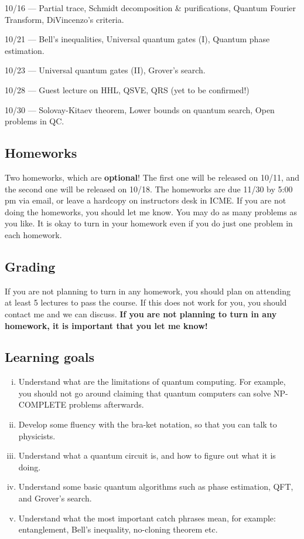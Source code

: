\documentclass[10pt]{article}
\newcounter{ex}
\theoremstyle{plain}
\theoremstyle{definition}
\begin{document}
10/16 --- Partial trace, Schmidt decomposition \& purifications, Quantum Fourier Transform, DiVincenzo's criteria.

10/21 --- Bell's inequalities, Universal quantum gates (I), Quantum phase estimation.

10/23 --- Universal quantum gates (II), Grover's search.

10/28 --- Guest lecture on HHL, QSVE, QRS (yet to be confirmed!)

10/30 --- Solovay-Kitaev theorem, Lower bounds on quantum search, Open problems in QC.

\subsection{Homeworks}
Two homeworks, which are \textbf{optional}! The first one will be released on 10/11, and the second one will be released on 10/18. The homeworks are due 11/30 by 5:00 pm via email, or leave a hardcopy on instructors desk in ICME. If you are not doing the homeworks, you should let me know. You may do as many problems as you like. It is okay to turn in your homework even if you do just one problem in each homework.

\subsection{Grading}
If you are not planning to turn in any homework, you should plan on attending at least 5 lectures to pass the course. If this does not work for you, you should contact me and we can discuss. \textbf{If you are not planning to turn in any homework, it is important that you let me know!}

\subsection{Learning goals}
\begin{enumerate}[(i)]
\item Understand what are the limitations of quantum computing. For example, you should not go around claiming that quantum computers can solve NP-COMPLETE problems afterwards.
\item Develop some fluency with the bra-ket notation, so that you can talk to physicists.
\item Understand what a quantum circuit is, and how to figure out what it is doing.
\item Understand some basic quantum algorithms such as phase estimation, QFT, and Grover's search.
\item Understand what the most important catch phrases mean, for example: entanglement, Bell's inequality, no-cloning theorem etc.
\end{enumerate}



\end{document}
